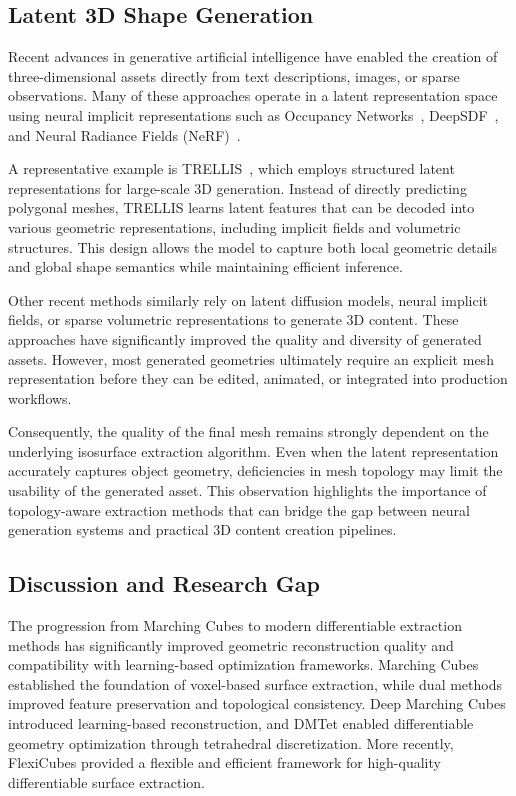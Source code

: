 \documentclass[../main.tex]{subfiles}
\begin{document}
\subsection{Latent 3D Shape Generation}

Recent advances in generative artificial intelligence have enabled the creation of three-dimensional assets directly from text descriptions, images, or sparse observations. Many of these approaches operate in a latent representation space using neural implicit representations such as Occupancy Networks~\cite{mescheder2019occupancy}, DeepSDF~\cite{park2019deepsdf}, and Neural Radiance Fields (NeRF)~\cite{mildenhall2020nerf}.

A representative example is TRELLIS~\cite{xiang2024structured}, which employs structured latent representations for large-scale 3D generation. Instead of directly predicting polygonal meshes, TRELLIS learns latent features that can be decoded into various geometric representations, including implicit fields and volumetric structures. This design allows the model to capture both local geometric details and global shape semantics while maintaining efficient inference.

Other recent methods similarly rely on latent diffusion models, neural implicit fields, or sparse volumetric representations to generate 3D content. These approaches have significantly improved the quality and diversity of generated assets. However, most generated geometries ultimately require an explicit mesh representation before they can be edited, animated, or integrated into production workflows.

Consequently, the quality of the final mesh remains strongly dependent on the underlying isosurface extraction algorithm. Even when the latent representation accurately captures object geometry, deficiencies in mesh topology may limit the usability of the generated asset. This observation highlights the importance of topology-aware extraction methods that can bridge the gap between neural generation systems and practical 3D content creation pipelines.

\subsection{Discussion and Research Gap}

The progression from Marching Cubes to modern differentiable extraction methods has significantly improved geometric reconstruction quality and compatibility with learning-based optimization frameworks. Marching Cubes established the foundation of voxel-based surface extraction, while dual methods improved feature preservation and topological consistency. Deep Marching Cubes introduced learning-based reconstruction, and DMTet enabled differentiable geometry optimization through tetrahedral discretization. More recently, FlexiCubes provided a flexible and efficient framework for high-quality differentiable surface extraction.
\end{document}
